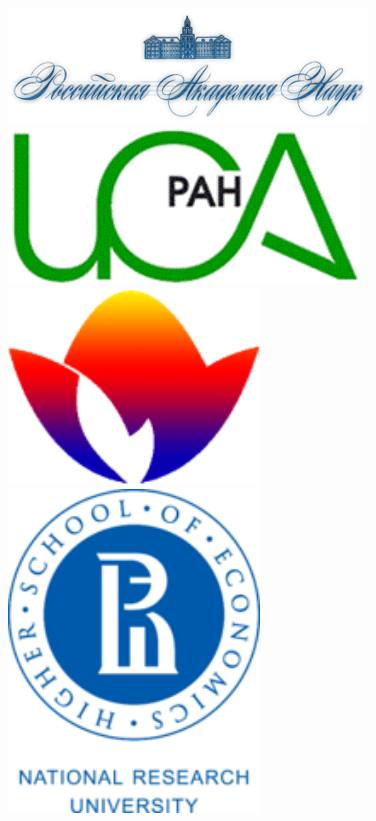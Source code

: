 \documentclass[default]{beamer}
\begin{document}
\begin{frame}
\begin{columns}
			\begin{column}{0.15\textwidth}
				\centering
				\includegraphics[width=\textwidth]{advert/ras.png}
				\vspace{7pt}
				\includegraphics[width=0.7\textwidth]{advert/isa.png}
				\vspace{7pt}
				\includegraphics[width=0.5\textwidth]{advert/raai.png}
				\vspace{7pt}
				\includegraphics[width=0.5\textwidth]{advert/hse.png}

\end{column}
\end{columns}
\end{frame}
\end{document}
